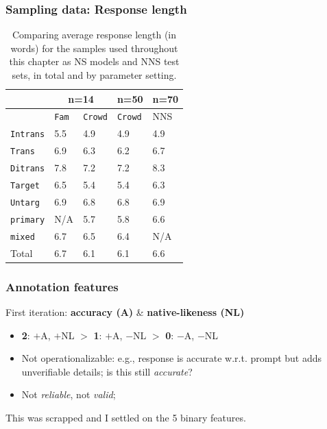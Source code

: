 \documentclass[xcolor={dvipsnames}]{beamer}
\newcommand{\param}[1]{\texttt{#1}}
\begin{document}
\begin{frame}
\frametitle{Sampling data: Response length}
\small
\begin{table}[htb!]
\begin{center}
\setlength{\tabcolsep}{.5em}
\begin{tabular}{|l||l|l|l||l|}
\hline
  & \multicolumn{2}{c|}{n=14} & n=50 & n=70\\
\hline
   & \param{Fam} & \param{Crowd} & \param{Crowd} 	& NNS			\\ \hline
\hline
\param{Intrans} & 5.5 	  		& 4.9 			& 4.9 		& 4.9 			\\ \hline
\param{Trans}   & 6.9          	& 6.3          	& 6.2       & 6.7    	    \\ \hline
\param{Ditrans} & 7.8          	& 7.2          	& 7.2       & 8.3    	    \\ \hline
\hline
\param{Target}  & 6.5 			& 5.4	 		& 5.4 		& 6.3			\\ \hline
\param{Untarg}  & 6.9        	& 6.8        	& 6.8    	& 6.9        	\\ \hline
\hline
\param{prim\-a\-ry} & N/A        	& 5.7 			& 5.8		& 6.6		 	\\ \hline
\param{mix\-ed}   & 6.7          	& 6.5          	& 6.4       & N/A	        \\ \hline
\hline
Total	& 6.7			& 6.1			& 6.1		& 6.6			\\ \hline
\end{tabular}
\caption{\label{tab:response-length}Comparing average response length (in words) for the samples used throughout this chapter as NS models and NNS test sets, in total and by parameter setting.}
\end{center}
\end{table}

\end{frame}

\begin{frame}
\frametitle{Annotation features}

\normalsize
\pause
First iteration: \textbf{accuracy (A)} \& \textbf{native-likeness (NL)}
\begin{itemize}
\pause
\item \textbf{2}: $+$A, $+$NL $>$ \textbf{1}: $+$A, $-$NL $>$ \textbf{0}: $-$A, $-$NL
\pause
\item Not operationalizable: e.g., response is accurate w.r.t. prompt but adds unverifiable details; is this still \textit{accurate}?
\item Not \textit{reliable}, not \textit{valid};
\end{itemize}
\pause
This was scrapped and I settled on the 5 binary features.

\end{frame}
\end{document}
